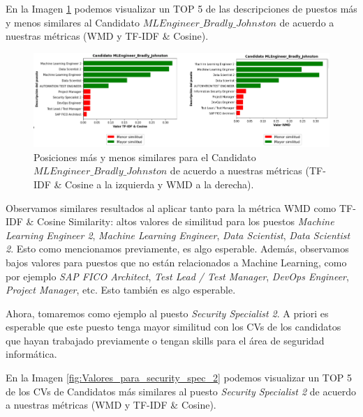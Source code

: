 \documentclass[12pt,a4paper]{article}
\begin{document}
\begin{sloppypar}
En la Imagen \ref{fig:Valores_para_Bradly_Johnson} podemos visualizar un TOP 5 de las descripciones de puestos más y menos similares al Candidato \textit{$MLEngineer\_Bradly\_Johnston$} de acuerdo a nuestras métricas (WMD y TF-IDF \& Cosine).
\\

\begin{figure}[H] 
 \centering
 \includegraphics[width=1\textwidth]{images/implementacion_5/Valores_para_Bradly_Johnson.png}
 \captionsetup{justification=centering,margin=2cm}
 \caption{Posiciones más y menos similares para el Candidato \textit{$MLEngineer\_Bradly\_Johnston$} de acuerdo a nuestras métricas (TF-IDF \& Cosine a la izquierda y WMD a la derecha).} 
 \label{fig:Valores_para_Bradly_Johnson}
\end{figure}

Observamos similares resultados al aplicar tanto para la métrica WMD como TF-IDF \& Cosine Similarity: altos valores de similitud para los puestos \textit{Machine Learning Engineer 2}, \textit{Machine Learning Engineer}, \textit{Data Scientist}, \textit{Data Scientist 2}. Esto como mencionamos previamente, es algo esperable. Además, observamos bajos valores para puestos que no están relacionados a Machine Learning, como por ejemplo \textit{SAP FICO Architect}, \textit{Test Lead / Test Manager}, \textit{DevOps Engineer}, \textit{Project Manager}, etc. Esto también es algo esperable.

\cleardoublepage

Ahora, tomaremos como ejemplo al puesto \textit{Security Specialist 2}. A priori es esperable que este puesto tenga mayor similitud con los CVs de los candidatos que hayan trabajado previamente o tengan skills para el área de seguridad informática. 

En la Imagen \ref{fig:Valores_para_security_spec_2} podemos visualizar un TOP 5 de los CVs de Candidatos más similares al puesto \textit{Security Specialist 2} de acuerdo a nuestras métricas (WMD y TF-IDF \& Cosine).


\end{sloppypar}
\end{document}
